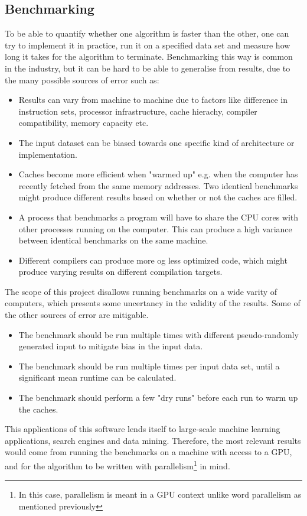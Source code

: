 \subsection{Benchmarking}
To be able to quantify whether one algorithm is faster than the other, one can try to implement it in practice, run it on a specified data set and measure how long it takes for the algorithm to terminate. Benchmarking this way is common in the industry, but it can be hard to be able to generalise from results, due to the many possible sources of error such as:
\begin{itemize}
    \item Results can vary from machine to machine due to factors like difference in instruction sets, processor infrastructure, cache hierachy, compiler compatibility, memory capacity etc.
    \item The input dataset can be biased towards one specific kind of architecture or implementation.
    \item Caches become more efficient when "warmed up" e.g. when the computer has recently fetched from the same memory addresses. Two identical benchmarks might produce different results based on whether or not the caches are filled.
    \item A process that benchmarks a program will have to share the CPU cores with other processes running on the computer. This can produce a high variance between identical benchmarks on the same machine.
    \item Different compilers can produce more og less optimized code, which might produce varying results on different compilation targets.
\end{itemize}
The scope of this project disallows running benchmarks on a wide varity of computers, which presents some uncertancy in the validity of the results. Some of the other sources of error are mitigable.
\begin{itemize}
    \item The benchmark should be run multiple times with different pseudo-randomly generated input to mitigate bias in the input data.
    \item The benchmark should be run multiple times per input data set, until a significant mean runtime can be calculated.
    \item The benchmark should perform a few "dry runs" before each run to warm up the caches.
\end{itemize}
This applications of this software lends itself to large-scale machine learning applications, search engines and data mining. Therefore, the most relevant results would come from running the benchmarks on a machine with access to a GPU, and for the algorithm to be written with parallelism\footnote{In this case, parallelism is meant in a GPU context unlike word parallelism as mentioned previously} in mind.
